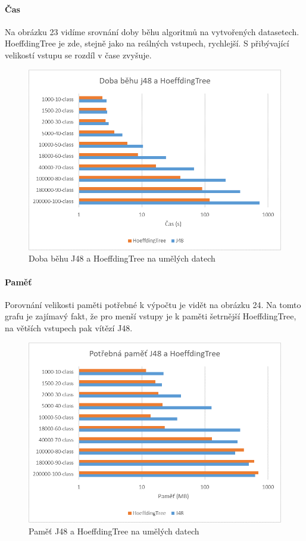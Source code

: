 \documentclass[12pt]{article}
\begin{document}
\paragraph{Čas}
Na obrázku 23 vidíme srovnání doby běhu algoritmů na vytvořených datasetech. HoeffdingTree je zde, stejně jako na reálných vstupech, rychlejší. S přibývající velikostí vstupu se rozdíl v čase zvyšuje.
\begin{figure}[hbp]
  \centering
  \includegraphics[scale=1]{img/genclasstime.png}
  \caption{Doba běhu J48 a HoeffdingTree na umělých datech}
\end{figure}

\newpage
\paragraph{Paměť}
Porovnání velikosti paměti potřebné k výpočtu je vidět na obrázku 24. Na tomto grafu je zajímavý fakt, že pro menší vstupy je k paměti šetrnější HoeffdingTree, na větších vstupech pak vítězí J48.
\begin{figure}[hbp]
  \centering
  \includegraphics[scale=1]{img/genclassmem.png}
  \caption{Paměť J48 a HoeffdingTree na umělých datech}
\end{figure}
\end{document}
